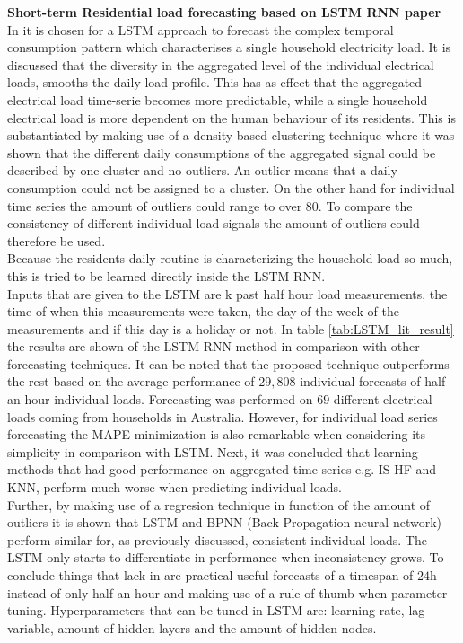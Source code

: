 \textbf{Short-term Residential load forecasting based on LSTM RNN paper}\\
In \cite{Kong2019} it is chosen for a LSTM approach to forecast the complex temporal consumption pattern which characterises a single household electricity load. It is discussed that the diversity in the aggregated level of the individual electrical loads, smooths the daily load profile. This has as effect that the aggregated electrical load time-serie becomes more predictable, while a single household electrical load is more dependent on the human behaviour of its residents. This is substantiated by making use of a density based clustering technique where it was shown that the different daily consumptions of the aggregated signal could be described by one cluster and no outliers. An outlier means that a daily consumption could not be assigned to a cluster. On the other hand for individual time series the amount of outliers could range to over $ 80 $. To compare the consistency of different individual load signals the amount of outliers could therefore be used.\\
Because the residents daily routine is characterizing the household load so much, this is tried to be learned directly inside the LSTM RNN.\\
Inputs that are given to the LSTM are k past half hour load measurements, the time of when this measurements were taken, the day of the week of the measurements and if this day is a holiday or not. In table \ref{tab:LSTM_lit_result} the results are shown of the LSTM RNN method in comparison with other forecasting techniques. It can be noted that the proposed technique outperforms the rest based on the average performance of $ 29,808 $ individual forecasts of half an hour individual loads. Forecasting was performed on $ 69 $ different electrical loads coming from households in Australia.  However, for individual load series forecasting the MAPE minimization is also remarkable when considering its simplicity in comparison with LSTM. Next, it was concluded that learning methods that had good performance on aggregated time-series e.g. IS-HF and KNN, perform much worse when predicting individual loads. \\
Further, by making use of a regresion technique in function of the amount of outliers it is shown that LSTM and BPNN (Back-Propagation neural network) perform similar for, as previously discussed, consistent individual loads. The LSTM only starts to differentiate in performance when inconsistency grows. To conclude things that lack in \cite{Kong2019} are practical useful forecasts of a timespan of $ 24 $h instead of only half an hour and making use of a rule of thumb when parameter tuning. Hyperparameters that can be tuned in LSTM are: learning rate, lag variable, amount of hidden layers and the amount of hidden nodes.\\

